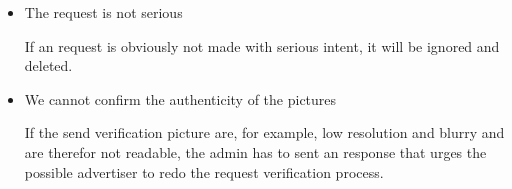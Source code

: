 \begin{itemize}
    \item The request is not serious
    
    If an request is obviously not made with serious intent, it will be ignored and deleted. 
    
    \item We cannot confirm the authenticity of the pictures
    
    If the send verification picture are, for example, low resolution and blurry and are therefor not readable, the admin has to sent an response that urges the possible advertiser to redo the request verification process.
    
\end{itemize}

\pagebreak
